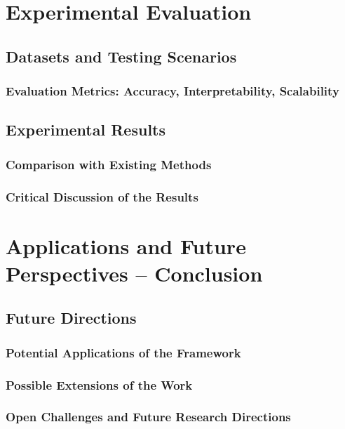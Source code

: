 \documentclass[12pt,a4paper]{report}
\begin{document}
\chapter{Experimental Evaluation}

\section{Datasets and Testing Scenarios}

\subsection{Evaluation Metrics: Accuracy, Interpretability, Scalability}

\section{Experimental Results}

\subsection{Comparison with Existing Methods}

\subsection{Critical Discussion of the Results}


\chapter{Applications and Future Perspectives – Conclusion}

\section{Future Directions}

\subsection{Potential Applications of the Framework}

\subsection{Possible Extensions of the Work}

\subsection{Open Challenges and Future Research Directions}
\end{document}
